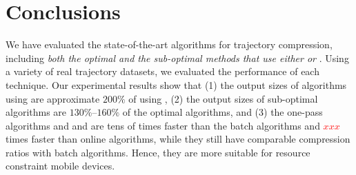 \vspace{-1ex}
\section{Conclusions}

We have evaluated the state-of-the-art \lsa algorithms for trajectory compression, including \emph{both the optimal and the sub-optimal methods that use either \ped or \sed}. 
Using a variety of real trajectory datasets, we evaluated the performance of each technique. %
Our experimental results show that 
(1) the output sizes of algorithms using \sed are approximate $200\%$ of using \ped, 
(2) the output sizes of sub-optimal algorithms are $130\%$--$160\%$ of the optimal algorithms, and 
(3) the one-pass algorithms \siped and \operb and \cised are tens of times faster than the batch algorithms and \textcolor{red}{$xxx$} times faster than online algorithms, while they still have comparable compression ratios with batch algorithms. Hence, they are more suitable for resource constraint mobile devices.